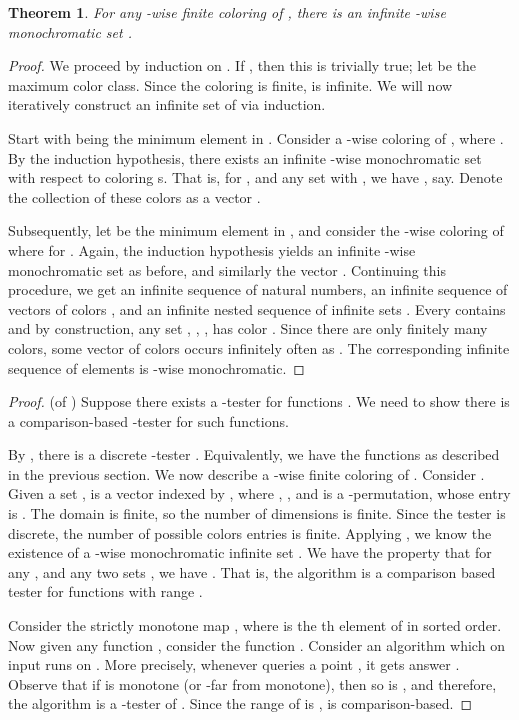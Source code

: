 \documentclass[11pt]{article}
\newtheorem{theorem}{Theorem}[section]
\begin{document}
\begin{theorem} \label{thm:ramsey} For any -wise  finite coloring of ,
there is an infinite -wise monochromatic set .
\end{theorem}
\begin{proof} We proceed by induction on . If , then this is trivially true; let  be
the maximum color class. Since the coloring is finite,  is infinite.
We will now iteratively construct an infinite set of  via induction.

Start with  being the minimum element in . Consider a -wise coloring of 
, where .
By the induction hypothesis, there exists an infinite -wise monochromatic
set  with respect to coloring s. 
That is, for , and any set  with , we have 
, say.
\def\C{{\mathbf C}}
Denote the collection of these colors as a vector .

 Subsequently, let  be the minimum element in , and consider the -wise coloring  of  where  for .
Again, the induction hypothesis yields an infinite -wise monochromatic set  as before, and similarly the vector . 
Continuing this procedure, 
we get an infinite sequence  of natural numbers, an infinite sequence
of vectors of  colors , and an infinite nested sequence of infinite sets .
Every  contains  and by construction, any set , , , 
has color . Since there are only finitely many colors, some vector of colors occurs infinitely often as . The corresponding
infinite sequence of elements  is -wise monochromatic.
\end{proof}



\begin{proof} (of ) 
Suppose there exists a -tester for functions . We need to show there is a comparison-based -tester for such functions.

By , there is a discrete -tester . Equivalently, we have the functions  as described in the previous section.
We now describe a -wise finite coloring of . 
Consider .
Given a set ,  is a vector indexed by , where , , and  is a -permutation, whose entry is .
The domain is finite, so the number of dimensions is finite.
Since the tester is discrete, the number of possible colors entries is finite.  
Applying , we know the existence of a -wise monochromatic infinite set . We have the property that for any , and any two sets , we have . That is, the algorithm  is a comparison based tester for functions with range . 



Consider the strictly monotone map , where  is the th element of   in sorted order. Now given any function , consider the function . 
Consider an algorithm  which on input  runs  on . More precisely, whenever  queries a point , it gets answer .  Observe that if  is monotone (or -far from monotone), then so is , and therefore, the algorithm  is a -tester of . Since the range of  is ,  
 is comparison-based.
\end{proof}
\end{document}
